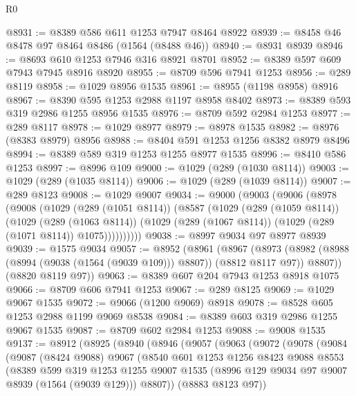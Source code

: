 \begin{lexlean}{R0}
\begin{coremodule}
@8931 := @8389 @586 @611 @1253 @7947 @8464 @8922
@8939 := @8458 @46 @8478 @97 @8464 @8486 (@1564 (@8488 @46))
@8940 := @8931 @8939
@8946 := @8693 @610 @1253 @7946 @316 @8921 @8701
@8952 := @8389 @597 @609 @7943 @7945 @8916 @8920
@8955 := @8709 @596 @7941 @1253
@8956 := @289 @8119
@8958 := @1029 @8956 @1535
@8961 := @8955 (@1198 @8958) @8916
@8967 := @8390 @595 @1253 @2988 @1197 @8958 @8402
@8973 := @8389 @593 @319 @2986 @1255 @8956 @1535
@8976 := @8709 @592 @2984 @1253
@8977 := @289 @8117
@8978 := @1029 @8977
@8979 := @8978 @1535
@8982 := @8976 (@8383 @8979) @8956
@8988 := @8404 @591 @1253 @1256 @8382 @8979 @8496
@8994 := @8389 @589 @319 @1253 @1255 @8977 @1535
@8996 := @8410 @586 @1253
@8997 := @8996 @109
@9000 := @1029 (@289 (@1030 @8114))
@9003 := @1029 (@289 (@1035 @8114))
@9006 := @1029 (@289 (@1039 @8114))
@9007 := @289 @8123
@9008 := @1029 @9007
@9034 := @9000
    (@9003
      (@9006
        (@8978
          (@9008
            (@1029
              (@289 (@1051 @8114))
              (@8587
                (@1029
                  (@289 (@1059 @8114))
                  (@1029
                    (@289 (@1063 @8114))
                    (@1029 (@289 (@1067 @8114)) (@1029 (@289 (@1071 @8114)) @1075))))))))))
@9038 := @8997 @9034 @97 @8977 @8939
@9039 := @1575 @9034
@9057 := @8952
    (@8961
      (@8967
        (@8973 (@8982 (@8988 (@8994 (@9038 (@1564 (@9039 @109))) @8807)) (@8812 @8117 @97)) @8807))
      (@8820 @8119 @97))
@9063 := @8389 @607 @204 @7943 @1253 @8918 @1075
@9066 := @8709 @606 @7941 @1253
@9067 := @289 @8125
@9069 := @1029 @9067 @1535
@9072 := @9066 (@1200 @9069) @8918
@9078 := @8528 @605 @1253 @2988 @1199 @9069 @8538
@9084 := @8389 @603 @319 @2986 @1255 @9067 @1535
@9087 := @8709 @602 @2984 @1253
@9088 := @9008 @1535
@9137 := @8912
    (@8925
      (@8940
        (@8946
          (@9057
            (@9063
              (@9072
                (@9078
                  (@9084
                    (@9087
                      (@8424 @9088)
                      @9067
                      (@8540
                        @601
                        @1253
                        @1256
                        @8423
                        @9088
                        @8553
                        (@8389
                          @599
                          @319
                          @1253
                          @1255
                          @9007
                          @1535
                          (@8996 @129 @9034 @97 @9007 @8939 (@1564 (@9039 @129)))
                          @8807))
                      (@8883 @8123 @97))

\end{coremodule}
\end{lexlean}

